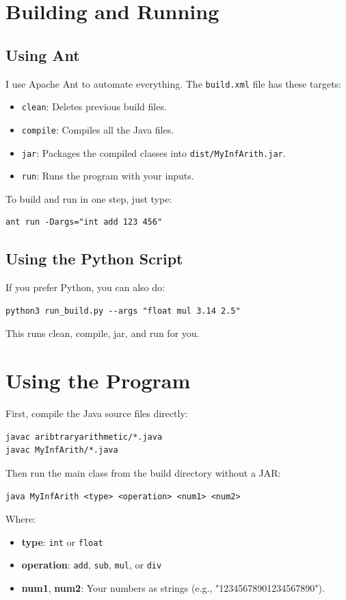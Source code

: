 \documentclass[11pt]{article}
\begin{document}
\section{Building and Running}
\subsection{Using Ant}
I use Apache Ant to automate everything. The \texttt{build.xml} file has these targets:
\begin{itemize}
  \item \texttt{clean}: Deletes previous build files.
  \item \texttt{compile}: Compiles all the Java files.
  \item \texttt{jar}: Packages the compiled classes into \texttt{dist/MyInfArith.jar}.
  \item \texttt{run}: Runs the program with your inputs.
\end{itemize}

To build and run in one step, just type:
\begin{verbatim}
ant run -Dargs="int add 123 456"
\end{verbatim}

\subsection{Using the Python Script}
If you prefer Python, you can also do:
\begin{verbatim}
python3 run_build.py --args "float mul 3.14 2.5"
\end{verbatim}
This runs clean, compile, jar, and run for you.

\section{Using the Program}
First, compile the Java source files directly:
\begin{verbatim}
javac aribtraryarithmetic/*.java
javac MyInfArith/*.java

\end{verbatim}

Then run the main class from the build directory without a JAR:
\begin{verbatim}
java MyInfArith <type> <operation> <num1> <num2>
\end{verbatim}

\noindent Where:
\begin{itemize}
  \item \textbf{type}: \texttt{int} or \texttt{float}
  \item \textbf{operation}: \texttt{add}, \texttt{sub}, \texttt{mul}, or \texttt{div}
  \item \textbf{num1}, \textbf{num2}: Your numbers as strings (e.g., "12345678901234567890").
\end{itemize}
\end{document}
